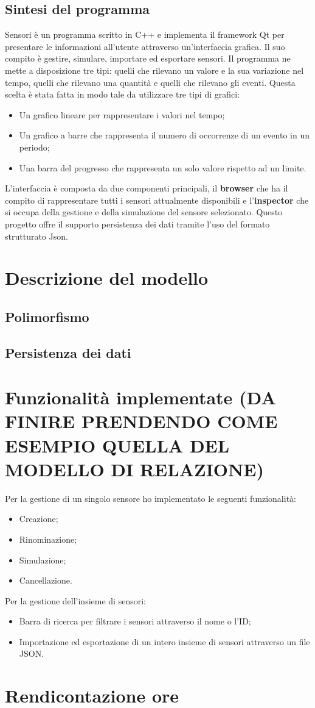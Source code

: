 \documentclass[a4paper]{article}
\begin{document}
\subsection{Sintesi del programma}
Sensori è un programma scritto in C++ e implementa il framework Qt per presentare le informazioni all'utente attraverso un'interfaccia grafica.
Il suo compito è gestire, simulare, importare ed esportare sensori.
Il programma ne mette a disposizione tre tipi: quelli che rilevano un valore e la sua variazione nel tempo, quelli che rilevano una quantità e 
quelli che rilevano gli eventi.
Questa scelta è stata fatta in modo tale da utilizzare tre tipi di grafici:
\begin{itemize}
    \item Un grafico lineare per rappresentare i valori nel tempo;
    \item Un grafico a barre che rappresenta il numero di occorrenze di un evento in un periodo;
    \item Una barra del progresso che rappresenta un solo valore rispetto ad un limite.
\end{itemize}
L'interfaccia è composta da due componenti principali, il \textbf{browser} che ha il compito di rappresentare tutti i sensori attualmente 
disponibili e l'\textbf{inspector} che si occupa della gestione e della simulazione del sensore selezionato.
Questo progetto offre il supporto persistenza dei dati tramite l'uso del formato strutturato Json.
\section{Descrizione del modello}

\subsection{Polimorfismo}
\subsection{Persistenza dei dati}
\section{Funzionalità implementate (DA FINIRE PRENDENDO COME ESEMPIO QUELLA DEL MODELLO DI RELAZIONE)}
Per la gestione di un singolo sensore ho implementato le seguenti funzionalità:
\begin{itemize}
    \item Creazione;
    \item Rinominazione;
    \item Simulazione;
    \item Cancellazione.
\end{itemize}
Per la gestione dell'insieme di sensori:
\begin{itemize}
    \item Barra di ricerca per filtrare i sensori attraverso il nome o l'ID;
    \item Importazione ed esportazione di un intero insieme di sensori attraverso un file JSON.
\end{itemize}
\section{Rendicontazione ore}
\end{document}
